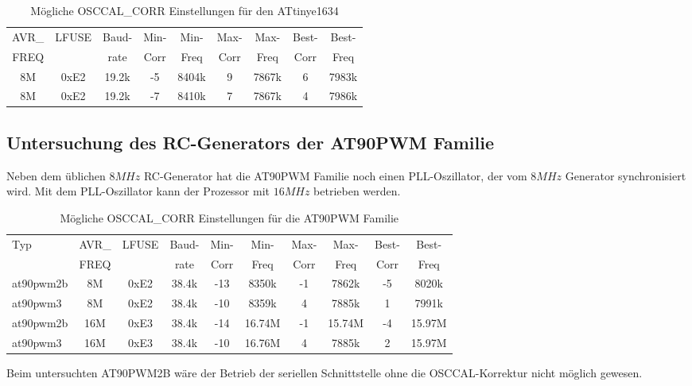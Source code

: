\begin{table}[H]
  \begin{center}
    \begin{tabular}{| c | c | c || c | c || c | c || c | c |}
    \hline
       AVR\_ & LFUSE & Baud- & Min- & Min- & Max- & Max- & Best- & Best-  \\
       FREQ  &       & rate & Corr & Freq & Corr & Freq  & Corr  & Freq  \\
    \hline
    \hline
         8M & 0xE2  & 19.2k &  -5  & 8404k &  9  & 7867k  & 6  & 7983k \\
         8M & 0xE2  & 19.2k &  -7  & 8410k &  7  & 7867k  & 4  & 7986k \\
    \hline
    \end{tabular}
  \end{center}
  \caption{Mögliche OSCCAL\_CORR Einstellungen für den ATtinye1634}
  \label{tab:tiny1634freq}
\end{table}

\subsection{Untersuchung des RC-Generators der AT90PWM Familie}

Neben dem üblichen \(8MHz\) RC-Generator hat die AT90PWM Familie noch einen
PLL-Oszillator, der vom \(8MHz\) Generator synchronisiert wird.
Mit dem PLL-Oszillator kann der Prozessor mit \(16MHz\) betrieben werden.

\begin{table}[H]
  \begin{center}
    \begin{tabular}{| l | c | c | c || c | c || c | c || c | c |}
    \hline
   Typ  &       AVR\_ & LFUSE & Baud- & Min- & Min- & Max- & Max- & Best- & Best-  \\
        &       FREQ  &       & rate & Corr & Freq & Corr & Freq  & Corr  & Freq  \\
    \hline
    \hline
at90pwm2b &         8M & 0xE2  & 38.4k &  -13  & 8350k & -1  & 7862k  & -5  & 8020k \\
    \hline
at90pwm3  &         8M & 0xE2  & 38.4k &  -10  & 8359k &  4  & 7885k  & 1  & 7991k \\
    \hline
at90pwm2b &        16M & 0xE3  & 38.4k &  -14  & 16.74M & -1  & 15.74M  & -4  & 15.97M \\
    \hline
at90pwm3  &        16M & 0xE3  & 38.4k &  -10  & 16.76M &  4  & 7885k  & 2  & 15.97M \\
    \hline
    \end{tabular}
  \end{center}
  \caption{Mögliche OSCCAL\_CORR Einstellungen für die AT90PWM Familie}
  \label{tab:t90pwmfreq}
\end{table}

Beim untersuchten AT90PWM2B wäre der Betrieb der seriellen Schnittstelle ohne
die OSCCAL-Korrektur nicht möglich gewesen.
